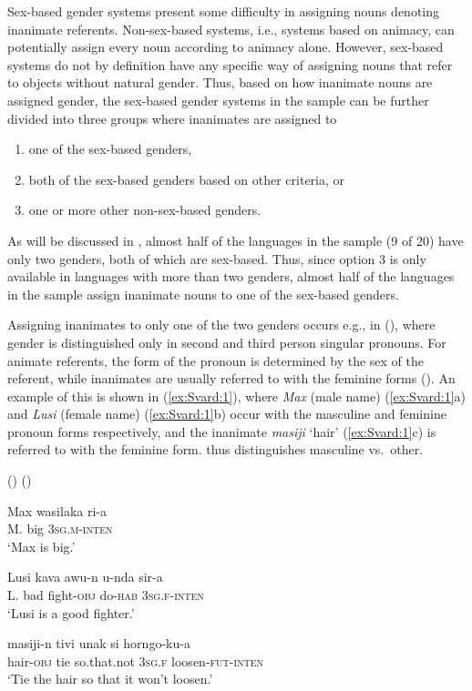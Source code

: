 \documentclass[output=collectionpaper]{langsci/langscibook}
\begin{document}
\largerpage
Sex-based gender systems present some difficulty in assigning nouns denoting inanimate referents. Non-sex-based systems, i.e., systems based on animacy, can potentially assign every noun according to animacy alone. However, sex-based systems do not by definition have any specific way of assigning nouns that refer to objects without natural gender. Thus, based on how inanimate nouns are assigned gender, the sex-based gender systems in the sample can be further divided into three groups where inanimates are assigned to

\begin{enumerate}
\item one of the sex-based genders,
\item both of the sex-based genders based on other criteria, or
\item one or more other non-sex-based genders.
\end{enumerate}
 

As will be discussed in , almost half of the languages in the sample (9 of 20) have only two genders, both of which are sex-based. Thus, since option 3 is only available in languages with more than two genders, almost half of the languages in the sample assign inanimate nouns to one of the sex-based genders.

  
Assigning inanimates to only one of the two genders occurs e.g., in  (), where gender is distinguished only in second and third person singular pronouns. For animate referents, the form of the pronoun is determined by the sex of the referent, while inanimates are usually referred to with the feminine forms (\citealt[17]{Hoel1994}). An example of this is shown in (\ref{ex:Svard:1}), where \textit{Max} (male name) (\ref{ex:Svard:1}a) and \textit{Lusi} (female name) (\ref{ex:Svard:1}b) occur with the masculine and feminine pronoun forms respectively, and the inanimate \textit{masiji} `hair' (\ref{ex:Svard:1}c) is referred to with the feminine form.  thus distinguishes masculine vs.\ other.

\ea
\label{ex:Svard:1}
 () (\citealt[19, 31, 46]{Hoel1994})\\
\begin{xlist}
\ex
\gll Max wasilaka ri-a\\
     M. big 3\textsc{sg.m-inten}\\
\glt `Max is big.'

\ex
\gll Lusi kava awu-n u-nda sir-a\\
     L. {bad\footnotemark} fight\textsc{{}-obj} do\textsc{{}-hab} \textsc{3sg.f-inten}\\
\glt `Lusi is a good fighter.'

\ex
\gll masiji-n tivi unak si horngo-ku-a\\
     hair-\textsc{obj} tie so.that.not 3\textsc{sg.f} loosen-\textsc{fut-inten}\\
\glt `Tie the hair so that it won't loosen.'
\end{xlist}
\z
{}
\end{document}
